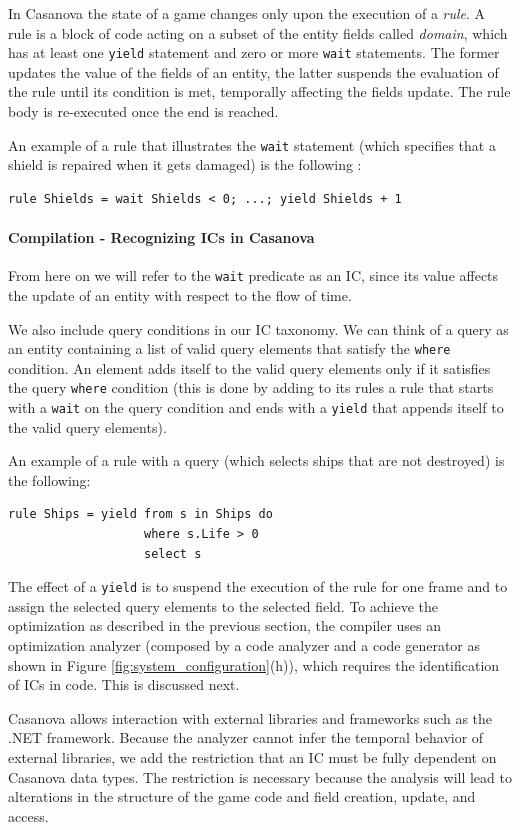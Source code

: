 In Casanova the state of a game changes only upon the execution of a \textit{rule}. A rule is a block of code acting on a subset of the entity fields called \textit{domain}, which has at least one \texttt{yield} statement and zero or more \texttt{wait} statements. The former updates the value of the fields of an entity, the latter suspends the evaluation of the rule until its condition is met, temporally affecting the fields update. The rule body is re-executed once the end is reached.

An example of a rule that illustrates the \texttt{wait} statement (which specifies that a shield is repaired when it gets damaged) is the following :
\begin{lstlisting}
rule Shields = wait Shields < 0; ...; yield Shields + 1
\end{lstlisting}
\paragraph*{Compilation - Recognizing ICs in Casanova}
From here on we will refer to the \texttt{wait} predicate as an IC, since its value affects the update of an entity with respect to the flow of time.

We also include query conditions in our IC taxonomy. We can think of a query as an entity containing a list of valid query elements that satisfy the \texttt{where} condition. An element adds itself to the valid query elements only if it satisfies the query \texttt{where} condition (this is done by adding to its rules a rule that starts with a \texttt{wait} on the query condition and ends with a \texttt{yield} that appends itself to the valid query elements).

An example of a rule with a query (which selects ships that are not destroyed) is the following:
\begin{lstlisting}
rule Ships = yield from s in Ships do
                   where s.Life > 0
                   select s
\end{lstlisting}
The effect of a \texttt{yield} is to suspend the execution of the rule for one frame and to assign the selected query elements to the selected field. To achieve the optimization as described in the previous section, the compiler uses an optimization analyzer (composed by a code analyzer and a code generator as shown in Figure \ref{fig:system_configuration}(h)), which requires the identification of ICs in code. This is discussed next.

Casanova allows interaction with external libraries and frameworks such as the .NET framework. Because the analyzer cannot infer the temporal behavior of external libraries, we add the restriction that an IC must be fully dependent on Casanova data types. The restriction is necessary because the analysis will lead to alterations in the structure of the game code and field creation, update, and access.

